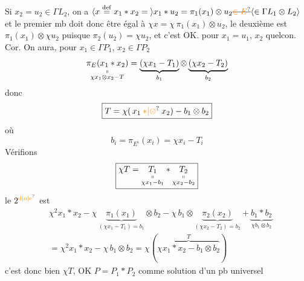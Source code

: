 Si $x_2=u_2\in\Gamma L_2$, on a $\inserted{x\overset{\mathrm{def}}{=}x_1*x_2={}}x_1*u_2=\pi_1(x_1)\otimes u_2\deleted{\unsure{\in E}}\inserted{\in\Gamma L_1\otimes L_2}$ et  le premier mb doit donc être égal à $\chi x=\chi\,\pi_1(x_1)\otimes u_2$, le deuxième est $\pi_1(x_1)\otimes\chi u_2$ puisque $\pi_2(u_2)=\chi u_2$, et c'est OK.  pour $x_1=u_1$, $x_2$ quelcon.
Cor. On aura, pour $x_1\in\Gamma P_1$, $x_2\in\Gamma P_2$
\[
\underset{\substack{\shortparallel\\\chi x_1\otimes x_2-T}}{\pi_E(x_1*x_2)}
=\underbrace{(\chi x_1-T_1)}_{b_1}\otimes\underbrace{(\chi x_2-T_2)}_{b_2}
\]
donc
\[
\boxed{T=\chi(\,x_1\mathbin{\unsure{*|\otimes}}x_2)-b_1\otimes b_2}
\]
où
\[
b_i=\pi_{E^i}(x_i)=\chi x_i-T_i
\]
Vérifions
\[
\boxed{\chi T=\underset{\substack{\shortparallel\\\chi x_1-b_1}}{T_1}*
\underset{\substack{\shortparallel\\\chi x_2-b_2}}{T_2}}
\]
le $2^{\mathrm{\unsure{d|o|e}}}$  est
\[
\begin{aligned}
&\chi^2 x_1*x_2-\chi\,\underbrace{\pi_1(x_1)}_{(\chi x_1-T_1)=b_1}\otimes b_2
-\chi\,b_1\otimes\underbrace{\pi_2(x_2)}_{(\chi x_2-T_2)=b_2}
+\underbrace{b_1*b_2}_{\chi b_1\otimes b_2}\\
&=\chi^2 x_1*x_2-\chi\,b_1\otimes b_2=\chi(\overbrace{\chi x_1*x_2-b_1\otimes b_2}^{T})
\end{aligned}
\]
c'est donc bien  $\chi T$, OK
$P=P_1*P_2$  comme solution d'un pb universel
